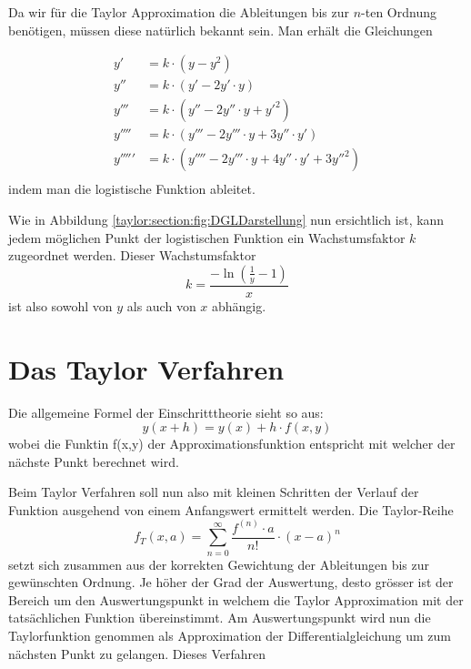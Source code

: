 Da wir für die Taylor Approximation die Ableitungen bis zur $n$-ten Ordnung benötigen, müssen diese natürlich bekannt sein. Man erhält die Gleichungen

\begin{equation}
	\begin{aligned}
		y'&=k\cdot (y-y^{2})\\
		y''&=k\cdot (y'-2y'\cdot y)\\
		y'''&=k\cdot (y''-2y''\cdot y+y'^{2})\\
		y''''&=k\cdot (y'''-2y'''\cdot y+3y''\cdot y')\\
		y'''''&=k\cdot (y''''-2y'''\cdot y+4y''\cdot y'+3y''^{2})\\
	\end{aligned}
\end{equation}
indem man die logistische Funktion ableitet.

Wie in Abbildung \ref{taylor:section:fig:DGLDarstellung} nun ersichtlich ist, kann jedem möglichen Punkt der logistischen Funktion ein Wachstumsfaktor $k$ zugeordnet werden. Dieser Wachstumsfaktor
\begin{equation}
	k=\frac{-\ln{(\frac{1}{y}-1)}}{x}
\end{equation}
ist also sowohl von $y$ als auch von $x$ abhängig.

\section{Das Taylor Verfahren}
\label{taylor:subsection:Vorgehen}
Die allgemeine Formel der Einschritttheorie sieht so aus:
\begin{equation}
y(x+h) = y(x) + h\cdot f(x,y)
\end{equation}
wobei die Funktin f(x,y) der Approximationsfunktion entspricht mit welcher der nächste Punkt berechnet wird.

Beim Taylor Verfahren soll nun also mit kleinen Schritten der Verlauf der Funktion ausgehend von einem Anfangswert ermittelt werden.
Die Taylor-Reihe
\begin{equation}
f_{T}(x,a)
=
\sum_{n=0}^{\infty}{\frac{f^{(n)}\cdot a}{n!}}\cdot (x-a)^{n}
\label{taylor:section:taylor}
\end{equation}
setzt sich zusammen aus der korrekten Gewichtung der Ableitungen bis zur gewünschten Ordnung.
Je höher der Grad der Auswertung, desto grösser ist der Bereich um den Auswertungspunkt in welchem die Taylor Approximation mit der tatsächlichen Funktion übereinstimmt.
Am Auswertungspunkt wird nun die Taylorfunktion genommen als Approximation der Differentialgleichung um zum nächsten Punkt zu gelangen.
Dieses Verfahren

